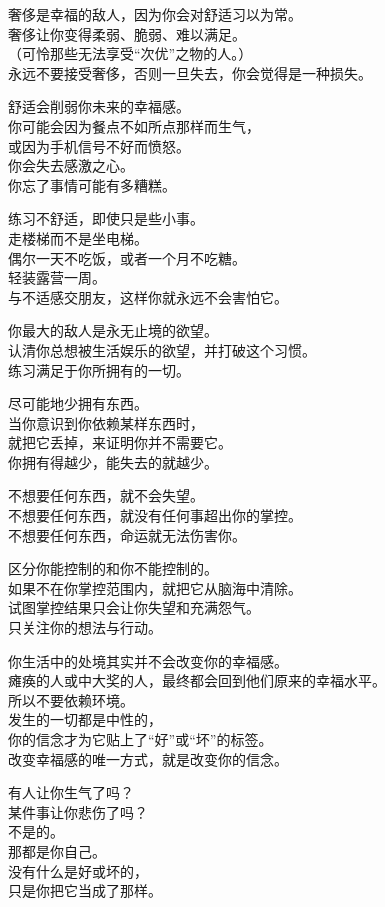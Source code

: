 \documentclass[
]{article}
\begin{document}
奢侈是幸福的敌人，因为你会对舒适习以为常。\\
奢侈让你变得柔弱、脆弱、难以满足。\\
（可怜那些无法享受``次优''之物的人。）\\
永远不要接受奢侈，否则一旦失去，你会觉得是一种损失。

舒适会削弱你未来的幸福感。\\
你可能会因为餐点不如所点那样而生气，\\
或因为手机信号不好而愤怒。\\
你会失去感激之心。\\
你忘了事情可能有多糟糕。

练习不舒适，即使只是些小事。\\
走楼梯而不是坐电梯。\\
偶尔一天不吃饭，或者一个月不吃糖。\\
轻装露营一周。\\
与不适感交朋友，这样你就永远不会害怕它。

你最大的敌人是永无止境的欲望。\\
认清你总想被生活娱乐的欲望，并打破这个习惯。\\
练习满足于你所拥有的一切。

尽可能地少拥有东西。\\
当你意识到你依赖某样东西时，\\
就把它丢掉，来证明你并不需要它。\\
你拥有得越少，能失去的就越少。

不想要任何东西，就不会失望。\\
不想要任何东西，就没有任何事超出你的掌控。\\
不想要任何东西，命运就无法伤害你。

区分你能控制的和你不能控制的。\\
如果不在你掌控范围内，就把它从脑海中清除。\\
试图掌控结果只会让你失望和充满怨气。\\
只关注你的想法与行动。

你生活中的处境其实并不会改变你的幸福感。\\
瘫痪的人或中大奖的人，最终都会回到他们原来的幸福水平。\\
所以不要依赖环境。\\
发生的一切都是中性的，\\
你的信念才为它贴上了``好''或``坏''的标签。\\
改变幸福感的唯一方式，就是改变你的信念。

有人让你生气了吗？\\
某件事让你悲伤了吗？\\
不是的。\\
那都是你自己。\\
没有什么是好或坏的，\\
只是你把它当成了那样。
\end{document}

